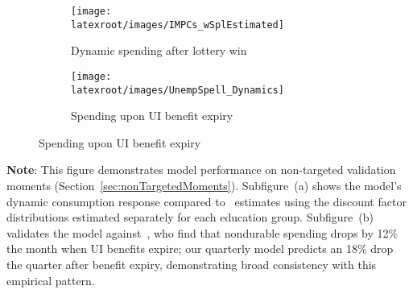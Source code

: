 \documentclass{econsocart}
\begin{document}
\begin{figure}[H]
  \centering
  \caption{Model validation for non-targeted spending patterns}
  \label{fig:untargetedMoments} 
  \noindent\begin{minipage}{\textwidth}
    \centering
    \begin{subfigure}[b]{.48\linewidth}
      \centering
      \texttt{[image: \\latexroot/images/IMPCs\_wSplEstimated]}
      \caption{Dynamic spending after lottery win}
      \label{fig:USaggmpclotterywin} 
    \end{subfigure}
    \begin{subfigure}[b]{.48\linewidth}
      \centering
      \texttt{[image: \\latexroot/images/UnempSpell\_Dynamics]}
      \caption{Spending upon UI benefit expiry}
      \label{fig:expiryUI} 
    \end{subfigure}
  \end{minipage}
\end{figure}
\noindent\parbox{\textwidth}{\footnotesize
  \textbf{Note}: This figure demonstrates model performance on non-targeted validation moments (Section~\ref{sec:nonTargetedMoments}).
  Subfigure~(a) shows the model's dynamic consumption response compared to~\cite{fagereng-mpc-2021} estimates
  using the discount factor distributions estimated separately for each education group.
  Subfigure~(b) validates the model against~\cite{ganongConsumer2019}, who find that nondurable spending
  drops by 12\% the month when UI benefits expire; our quarterly model predicts an 18\% drop
  the quarter after benefit expiry,   demonstrating broad consistency with this empirical pattern.
}

\vspace{1em}  %
\end{document}
